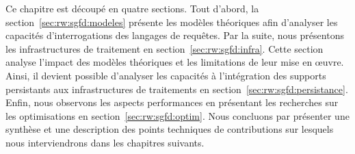 Ce chapitre est découpé en quatre sections. Tout d'abord, la section~\ref{sec:rw:sgfd:modeles} présente les modèles théoriques afin d'analyser les capacités d'interrogations des langages de requêtes. Par la suite, nous présentons les infrastructures de traitement en section~\ref{sec:rw:sgfd:infra}. Cette section analyse l'impact des modèles théoriques et les limitations de leur mise en œuvre. Ainsi, il devient possible d'analyser les capacités à l'intégration des supports persistants aux infrastructures de traitements en section~\ref{sec:rw:sgfd:persistance}. Enfin, nous observons les aspects performances en présentant les recherches sur les optimisations en section~\ref{sec:rw:sgfd:optim}. Nous concluons par présenter une synthèse et une description des points techniques de contributions sur lesquels nous interviendrons dans les chapitres suivants.






